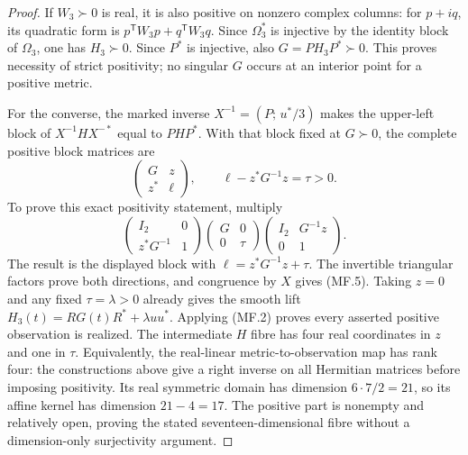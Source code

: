 \begin{proof}
If $W_3\succ0$ is real, it is also positive on nonzero complex columns:
for $p+iq$, its quadratic form is $p^{\mathsf T}W_3p+
q^{\mathsf T}W_3q$.  Since $\Omega_3^*$ is injective by the identity
block of $\Omega_3$, one has $H_3\succ0$.  Since $P^*$ is injective,
also $G=PH_3P^*\succ0$.  This proves necessity of strict positivity;
no singular $G$ occurs at an interior point for a positive metric.

For the converse, the marked inverse $X^{-1}=(P;\,u^*/3)$ makes the
upper-left block of $X^{-1}HX^{-*}$ equal to $PH P^*$.  With that block
fixed at $G\succ0$, the complete positive block matrices are
\[
 \begin{pmatrix}G&z\\z^*&\ell\end{pmatrix},\qquad
 \ell-z^*G^{-1}z=\tau>0.
\]
To prove this exact positivity statement, multiply
\[
 \begin{pmatrix}I_2&0\\z^*G^{-1}&1\end{pmatrix}
 \begin{pmatrix}G&0\\0&\tau\end{pmatrix}
 \begin{pmatrix}I_2&G^{-1}z\\0&1\end{pmatrix}.
\]
The result is the displayed block with $\ell=z^*G^{-1}z+\tau$.
The invertible triangular factors prove both directions, and congruence
by $X$ gives (MF.5).  Taking $z=0$ and any fixed $\tau=\lambda>0$
already gives the smooth lift $H_3(t)=RG(t)R^*+\lambda uu^*$.
Applying (MF.2) proves every asserted positive observation is realized.
The intermediate $H$ fibre has four real coordinates in $z$ and one in
$\tau$.  Equivalently, the real-linear metric-to-observation map has rank
four: the constructions above give a right inverse on all Hermitian
matrices before imposing positivity.  Its real symmetric domain has
dimension $6\cdot7/2=21$, so its affine kernel has dimension $21-4=17$.
The positive part is nonempty and relatively open, proving the stated
seventeen-dimensional fibre without a dimension-only surjectivity argument.
\end{proof}

